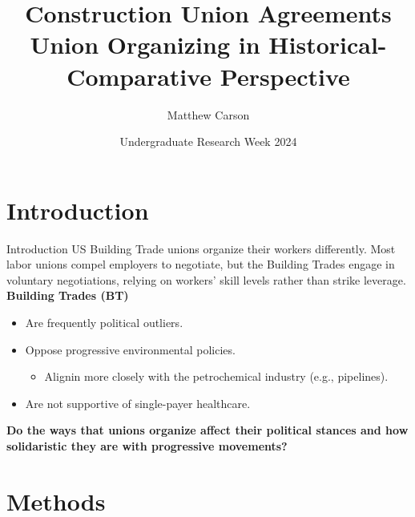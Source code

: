 \documentclass{beamer}
\title[Construction Union\ldots{Historical-Comparative}]{Construction Union Agreements\\
Union Organizing in Historical-Comparative Perspective}
\author{Matthew Carson}
\date[Undergrad. Research Week '24]{Undergraduate Research Week 2024}
\begin{document}
\begin{frame}
  \titlepage
\end{frame}


\section{Introduction}
\begin{frame}{Introduction}
	US Building Trade unions organize their workers differently. Most labor unions compel employers to negotiate, but the Building Trades engage in voluntary negotiations, relying on workers' skill levels rather than strike leverage. 
	\newline\newline
	\textbf{Building Trades (BT)}
	\begin{itemize}
		\item Are frequently political outliers.
		\item Oppose progressive environmental policies.
		\begin{itemize}
			\item Alignin more closely with the petrochemical industry (e.g., pipelines).
		\end{itemize}
		\item Are not supportive of single-payer healthcare.
	\end{itemize}

\textbf{Do the ways that unions organize affect their political stances and how solidaristic they are with progressive movements?}
	
\end{frame}

\section{Methods}
\end{document}

